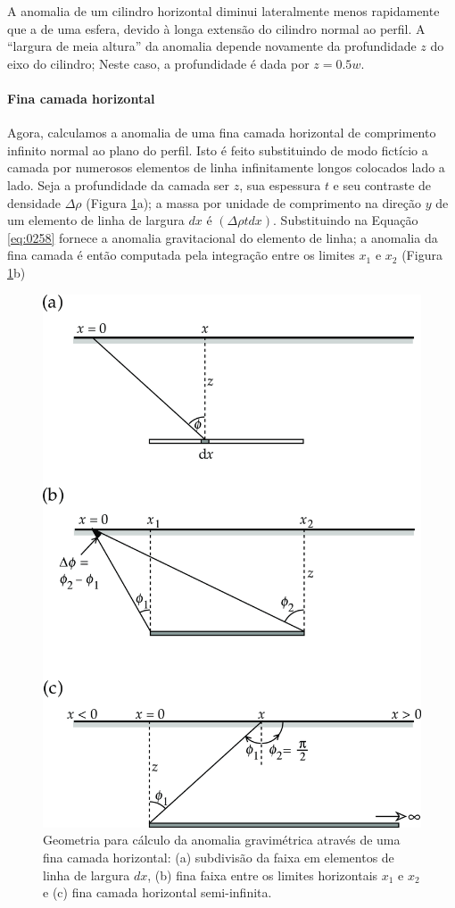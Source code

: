 \documentclass[]{book}
\let\oldparagraph\paragraph
\renewcommand{\paragraph}[1]{\oldparagraph{#1}\mbox{}}
\theoremstyle{definition}
\theoremstyle{definition}
\theoremstyle{definition}
\theoremstyle{remark}
\begin{document}
A anomalia de um cilindro horizontal diminui lateralmente menos rapidamente que a de uma esfera, devido à longa extensão do cilindro normal ao perfil. A ``largura de meia altura'' da anomalia depende novamente da profundidade \(z\) do eixo do cilindro; Neste caso, a profundidade é dada por \(z=0.5w\).

\hypertarget{fina-camada-horizontal}{%
\paragraph{Fina camada horizontal}\label{fina-camada-horizontal}}

Agora, calculamos a anomalia de uma fina camada horizontal de comprimento infinito normal ao plano do perfil. Isto é feito substituindo de modo fictício a camada por numerosos elementos de linha infinitamente longos colocados lado a lado. Seja a profundidade da camada ser \(z\), sua espessura \(t\) e seu contraste de densidade \(\Delta\rho\) (Figura \ref{fig:folha}a); a massa por unidade de comprimento na direção \(y\) de um elemento de linha de largura \(dx\) é \((\Delta \rho t dx)\). Substituindo na Equação \eqref{eq:0258} fornece a anomalia gravitacional do elemento de linha; a anomalia da fina camada é então computada pela integração entre os limites \(x_1\) e \(x_2\) (Figura \ref{fig:folha}b)

\begin{figure}

{\centering \includegraphics[width=0.6\linewidth]{fig/Fig_02.46} 

}

\caption{Geometria para cálculo da anomalia gravimétrica através de uma fina camada horizontal: (a) subdivisão da faixa em elementos de linha de largura $dx$, (b) fina faixa entre os limites horizontais $x_1$ e $x_2$ e (c) fina camada horizontal semi-infinita.}\label{fig:folha}
\end{figure}
\end{document}
